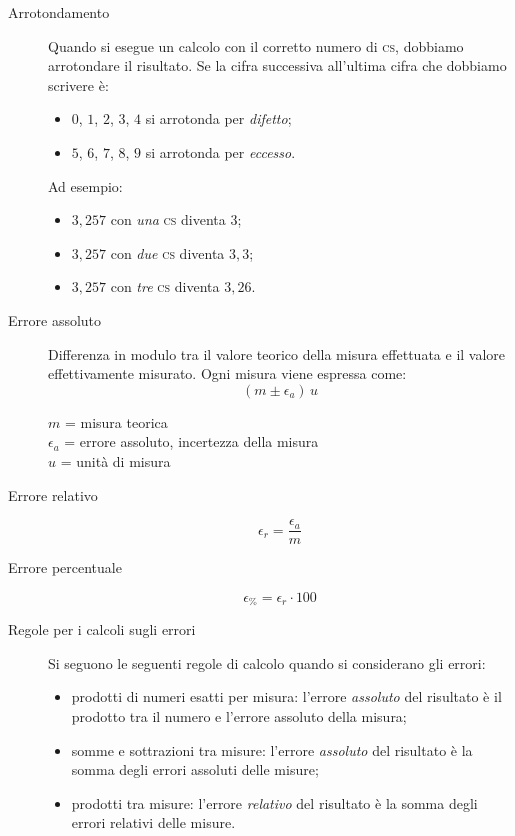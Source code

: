 \documentclass[a4paper,11pt,italian]{article}
\begin{document}
\begin{description}
  \item[Arrotondamento] Quando si esegue un calcolo con il corretto numero di \textsc{cs}, dobbiamo arrotondare il risultato. Se la cifra successiva all'ultima cifra che dobbiamo scrivere è:
  \begin{multicols}{2}
  \begin{itemize}
    \item $ 0 $, $ 1 $, $ 2 $, $ 3 $, $ 4 $ si arrotonda per \emph{difetto};
    \item $ 5 $, $ 6 $, $ 7 $, $ 8 $, $ 9 $ si arrotonda per \emph{eccesso}.
  \end{itemize}
  \end{multicols}
  Ad esempio:
  \begin{itemize}
    \item $ 3,257 $ con \emph{una} \textsc{cs} diventa $ 3 $;
    \item $ 3,257 $ con \emph{due} \textsc{cs} diventa $ 3,3 $;
    \item $ 3,257 $ con \emph{tre} \textsc{cs} diventa $ 3,26 $.
  \end{itemize}

  \item[Errore assoluto] Differenza in modulo tra il valore teorico della misura effettuata e il valore effettivamente misurato. Ogni misura viene espressa come:\[ (m \pm \epsilon_a) \, u \]
  \begin{multicols}{2}
  $ m $ = misura teorica\\
  $ \epsilon_a $ = errore assoluto, incertezza della misura\\
  $ u $ = unità di misura
  \end{multicols}
  
  \item[Errore relativo] 
  \[ \epsilon_{r} = \frac{\epsilon_a}{m} \]
  
  \item[Errore percentuale] 
  \[ \epsilon_\% = \epsilon_r \cdot 100 \]
  
  \item[Regole per i calcoli sugli errori] Si seguono le seguenti regole di calcolo quando si considerano gli errori:
  \begin{itemize}
    \item prodotti di numeri esatti per misura: l'errore \emph{assoluto} del risultato è il prodotto tra il numero e l'errore assoluto della misura;
    \item somme e sottrazioni tra misure: l'errore \emph{assoluto} del risultato è la somma degli errori assoluti delle misure;
    \item prodotti tra misure: l'errore \emph{relativo} del risultato è la somma degli errori relativi delle misure.
  \end{itemize}
\end{description}
\end{document}
